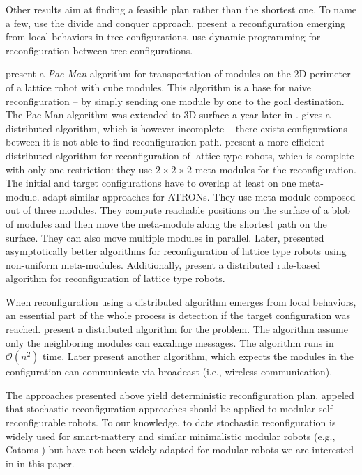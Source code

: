 Other results aim at finding a feasible plan rather than the shortest one. To
name a few, \textcite{10.1117/12.360345} use the divide and conquer approach.
\textcite{DBLP:conf/icra/HouS08} present a reconfiguration emerging from local
behaviors in tree configurations. \textcite{DBLP:journals/ral/LiuWY19} use
dynamic programming for reconfiguration between tree configurations.

\textcite{DBLP:conf/iros/ButlerBR01} present a \emph{Pac Man} algorithm for
transportation of modules on the 2D perimeter of a lattice robot with cube
modules. This algorithm is a base for naive reconfiguration -- by simply sending
one module by one to the goal destination. The Pac Man algorithm was extended to
3D surface a year later in \cite{DBLP:conf/wafr/ButlerR02}.
\textcite{DBLP:journals/dc/WalterWA00} gives a distributed algorithm, which is
however incomplete -- there exists configurations between it is not able to find
reconfiguration path. \textcite{DBLP:conf/icra/VassilvitskiiYS02} present a more
efficient distributed algorithm for reconfiguration of lattice type robots,
which is complete with only one restriction: they use $2\times2\times2$
meta-modules for the reconfiguration. The initial and target configurations have
to overlap at least on one meta-module.
\textcite{DBLP:conf/ieeealife/Christensen07} adapt similar approaches for
ATRONs. They use meta-module composed out of three modules. They compute
reachable positions on the surface of a blob of modules and then move the
meta-module along the shortest path on the surface. They can also move multiple
modules in parallel. Later, \textcite{DBLP:journals/comgeo/AloupisBDDFIW13}
presented asymptotically better algorithms for reconfiguration of lattice type
robots using non-uniform meta-modules. Additionally,
\textcite{DBLP:conf/pdp/PirandaB16} present a distributed rule-based algorithm
for reconfiguration of lattice type robots.

When reconfiguration using a distributed algorithm emerges from local behaviors,
an essential part of the whole process is detection if the target configuration
was reached. \textcite{DBLP:conf/icra/ButlerFRW02} present a distributed
algorithm for the problem. The algorithm assume only the neighboring modules can
excahnge messages. The algorithm runs in $\mathcal{O}(n^2)$ time. Later
\textcite{DBLP:journals/ras/BacaWDN17} present another algorithm, which expects
the modules in the configuration can communicate via broadcast (i.e., wireless
communication).

The approaches presented above yield deterministic reconfiguration plan.
\textcite{4141032} appeled that stochastic reconfiguration approaches should be
applied to modular self-reconfigurable robots. To our knowledge, to date
stochastic reconfiguration is widely used for smart-mattery and similar
minimalistic modular robots (e.g., Catoms \cite{DBLP:conf/aaai/KirbyCAPHMG05})
but have not been widely adapted for  modular robots we are
interested in in this paper.

